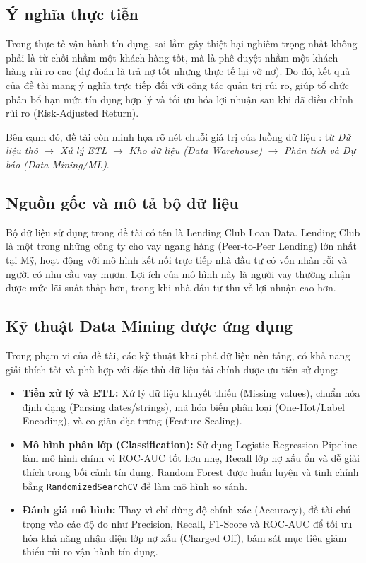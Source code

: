 \subsection{Ý nghĩa thực tiễn}
Trong thực tế vận hành tín dụng, sai lầm gây thiệt hại nghiêm trọng nhất không phải là từ chối nhầm một khách hàng tốt, mà là phê duyệt nhầm một khách hàng rủi ro cao (dự đoán là trả nợ tốt nhưng thực tế lại vỡ nợ). Do đó, kết quả của đề tài mang ý nghĩa trực tiếp đối với công tác quản trị rủi ro, giúp tổ chức phân bổ hạn mức tín dụng hợp lý và tối ưu hóa lợi nhuận sau khi đã điều chỉnh rủi ro (Risk-Adjusted Return).

Bên cạnh đó, đề tài còn minh họa rõ nét chuỗi giá trị của luồng dữ liệu : từ \textit{Dữ liệu thô} $\rightarrow$ \textit{Xử lý ETL} $\rightarrow$ \textit{Kho dữ liệu (Data Warehouse)} $\rightarrow$ \textit{Phân tích và Dự báo (Data Mining/ML)}.

\subsection{Nguồn gốc và mô tả bộ dữ liệu}
Bộ dữ liệu sử dụng trong đề tài có tên là Lending Club Loan Data. Lending Club là một trong những công ty cho vay ngang hàng (Peer-to-Peer Lending) lớn nhất tại Mỹ, hoạt động với mô hình kết nối trực tiếp nhà đầu tư có vốn nhàn rỗi và người có nhu cầu vay mượn. Lợi ích của mô hình này là người vay thường nhận được mức lãi suất thấp hơn, trong khi nhà đầu tư thu về lợi nhuận cao hơn.


\subsection{Kỹ thuật Data Mining được ứng dụng}
Trong phạm vi của đề tài, các kỹ thuật khai phá dữ liệu nền tảng, có khả năng giải thích tốt và phù hợp với đặc thù dữ liệu tài chính được ưu tiên sử dụng:
\begin{itemize}
    \item \textbf{Tiền xử lý và ETL:} Xử lý dữ liệu khuyết thiếu (Missing values), chuẩn hóa định dạng (Parsing dates/strings), mã hóa biến phân loại (One-Hot/Label Encoding), và co giãn đặc trưng (Feature Scaling).
    \item \textbf{Mô hình phân lớp (Classification):} Sử dụng Logistic Regression Pipeline làm mô hình chính vì ROC-AUC tốt hơn nhẹ, Recall lớp nợ xấu ổn và dễ giải thích trong bối cảnh tín dụng. Random Forest được huấn luyện và tinh chỉnh bằng \texttt{RandomizedSearchCV} để làm mô hình so sánh.
    \item \textbf{Đánh giá mô hình:} Thay vì chỉ dùng độ chính xác (Accuracy), đề tài chú trọng vào các độ đo như Precision, Recall, F1-Score và ROC-AUC để tối ưu hóa khả năng nhận diện lớp nợ xấu (Charged Off), bám sát mục tiêu giảm thiểu rủi ro vận hành tín dụng.
\end{itemize}
